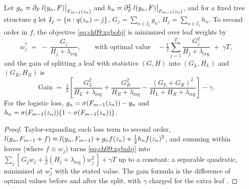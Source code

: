 \begin{proposition}\label{prop:ch09:xgb}
Let $g_n = \partial_F\, l(y_n, F)\big|_{F_{m-1}(z_n)}$ and
$h_n = \partial^2_F\, l(y_n, F)\big|_{F_{m-1}(z_n)}$, and for a
fixed tree structure $q$ let $I_j = \{n : q(z_n) = j\}$,
$G_j = \sum_{n \in I_j} g_n$, $H_j = \sum_{n \in I_j} h_n$. To second
order in $f$, the objective \cref{eq:ch09:xgbobj} is minimized over leaf
weights by
\[
w_j^{*} \;=\; -\,\frac{G_j}{H_j + \lambda_{\mathrm{reg}}},
\qquad
\text{with optimal value}
\quad
-\tfrac{1}{2} \sum_{j=1}^{T} \frac{G_j^{2}}{H_j + \lambda_{\mathrm{reg}}}
\;+\; \gamma T,
\]
and the gain of splitting a leaf with statistics $(G, H)$ into
$(G_L, H_L)$ and $(G_R, H_R)$ is
\begin{equation}\label{eq:ch09:gain}
\mathrm{Gain} \;=\; \tfrac{1}{2}\left[
\frac{G_L^{2}}{H_L + \lambda_{\mathrm{reg}}}
+ \frac{G_R^{2}}{H_R + \lambda_{\mathrm{reg}}}
- \frac{(G_L + G_R)^{2}}{H_L + H_R + \lambda_{\mathrm{reg}}}
\right] - \gamma .
\end{equation}
For the logistic loss, $g_n = \sigma(F_{m-1}(z_n)) - y_n$ and
$h_n = \sigma(F_{m-1}(z_n))\big(1 - \sigma(F_{m-1}(z_n))\big)$.
\end{proposition}

\begin{proof}
Taylor-expanding each loss term to second order,
$l(y_n, F_{m-1} + f) \approx l(y_n, F_{m-1}) + g_n f(z_n) +
\tfrac12 h_n f(z_n)^2$, and summing within leaves (where
$f \equiv w_j$) turns \cref{eq:ch09:xgbobj} into $\sum_j [\, G_j w_j +
\tfrac12 (H_j + \lambda_{\mathrm{reg}}) w_j^2 \,] + \gamma T$ up to a
constant: a separable quadratic, minimized at $w_j^{*}$ with the stated
value. The gain formula is the difference of optimal values before and
after the split, with $\gamma$ charged for the extra leaf
\citep{chenguestrin2016}.
\end{proof}

